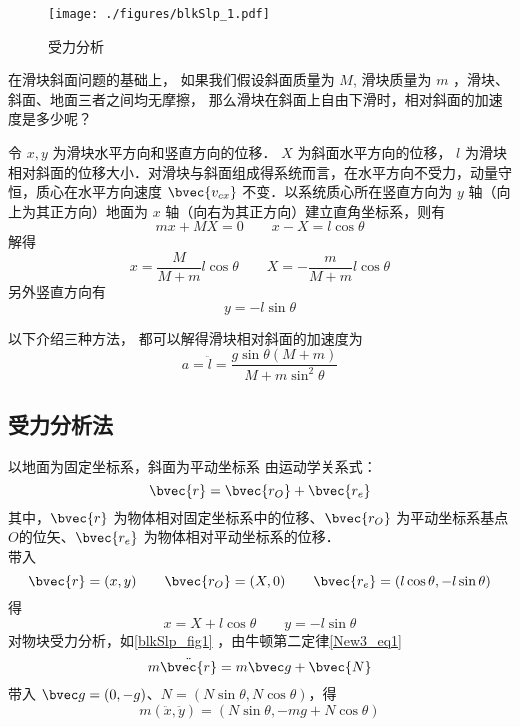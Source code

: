 
\begin{issues}
\issueTODO
\end{issues}


\begin{figure}[ht]
\centering
\texttt{[image: ./figures/blkSlp\_1.pdf]}
\caption{受力分析} \label{blkSlp_fig1}
\end{figure}

在滑块斜面问题的基础上， 如果我们假设斜面质量为 $M$, 滑块质量为 $m$ ，滑块、斜面、地面三者之间均无摩擦， 那么滑块在斜面上自由下滑时，相对斜面的加速度是多少呢？

令 $x, y$ 为滑块水平方向和竖直方向的位移． $X$ 为斜面水平方向的位移， $l$ 为滑块相对斜面的位移大小．对滑块与斜面组成得系统而言，在水平方向不受力，动量守恒，质心在水平方向速度 $\bvec{v_{cx}}$ 不变．以系统质心所在竖直方向为 $y$ 轴（向上为其正方向）地面为 $x$ 轴（向右为其正方向）建立直角坐标系，则有
\begin{equation}
mx+MX=0 \qquad x-X=l\cos\theta
\end{equation}
解得
\begin{equation}\label{blkSlp_eq2}
x = \frac{M}{M + m}l\cos\theta \qquad X = -\frac{m}{M + m}l\cos\theta
\end{equation}
另外竖直方向有
\begin{equation}
y = -l\sin\theta
\end{equation}

以下介绍三种方法， 都可以解得滑块相对斜面的加速度为
\begin{equation}\label{blkSlp_eq1}
a = \ddot l = \frac{g\sin\theta(M+m)}{M + m\sin^2\theta}
\end{equation}

\subsection{受力分析法}
以地面为固定坐标系，斜面为平动坐标系
由运动学关系式：
\begin{equation}
\bvec{r}=\bvec{r_{O}}+\bvec{r_{e}}
\end{equation}
其中，$\bvec{r}$ 为物体相对固定坐标系中的位移、$\bvec{r_{O}}$ 为平动坐标系基点$O$的位矢、$\bvec{r_{e}}$ 为物体相对平动坐标系的位移．\\
带入
\begin{equation}
\bvec{r}=(x,y)\qquad \bvec{r_O}=(X,0)\qquad \bvec{r_e}=(l\cos\theta,-l\sin\theta)
\end{equation}
得
\begin{equation}\label{blkSlp_eq3}
x=X+l\cos\theta \qquad y=-l\sin\theta
\end{equation}
对物块受力分析，如\autoref{blkSlp_fig1} ，由牛顿第二定律\autoref{New3_eq1}~
\begin{equation}
m\ddot{\bvec{r}}=m\bvec g+\bvec{N}
\end{equation}
带入 $\bvec g=(0,-g)$、$N=(N\sin\theta,N\cos\theta)$，得
\begin{equation}\label{blkSlp_eq4}
m(\ddot x,\ddot y)=(N\sin\theta,-mg+N\cos\theta)
\end{equation}

